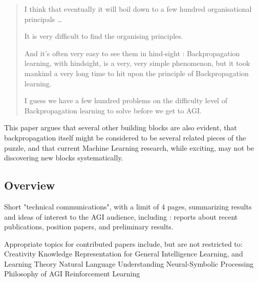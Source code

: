 \documentclass{llncs}
\begin{document}
\begin{quotation}

I think that 
eventually it will boil down to a few hundred organisational principals
\dots



It is very difficult to find the organising principles.

And it's often very easy to see them in hind-sight : 
Backpropagation learning, with hindsight, is a very, very simple phenomenon, 
but it took mankind a  very long time to hit upon the principle of Backpropagation learning. 

I guess we have a few hundred problems on the difficulty level of Backpropagation learning to solve before we get to AGI. 


\end{quotation}

This paper argues that several other building blocks are also evident, 
that backpropagation itself might be considered to be several related pieces of the puzzle,
and that current Machine Learning research, while exciting, may not be
discovering new blocks systematically.

\subsection{Overview}

Short "technical communications", with a limit of 4 pages, 
summarizing results and ideas of interest to the AGI audience, 
including : 
  reports about recent publications, 
  position papers, and 
  preliminary results.


Appropriate topics for contributed papers include, but are not restricted to:
  Creativity
  Knowledge Representation for General Intelligence
  Learning, and Learning Theory
  Natural Language Understanding
  Neural-Symbolic Processing
  Philosophy of AGI
  Reinforcement Learning
\end{document}
